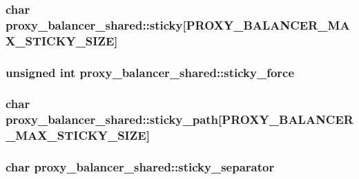 \subsubsection[{\texorpdfstring{sticky}{sticky}}]{\setlength{\rightskip}{0pt plus 5cm}char proxy\+\_\+balancer\+\_\+shared\+::sticky\mbox{[}{\bf P\+R\+O\+X\+Y\+\_\+\+B\+A\+L\+A\+N\+C\+E\+R\+\_\+\+M\+A\+X\+\_\+\+S\+T\+I\+C\+K\+Y\+\_\+\+S\+I\+ZE}\mbox{]}}\hypertarget{structproxy__balancer__shared_ab4c4a86341df3c258f51e8a828a21501}{}\label{structproxy__balancer__shared_ab4c4a86341df3c258f51e8a828a21501}
\subsubsection[{\texorpdfstring{sticky\+\_\+force}{sticky_force}}]{\setlength{\rightskip}{0pt plus 5cm}unsigned {\bf int} proxy\+\_\+balancer\+\_\+shared\+::sticky\+\_\+force}\hypertarget{structproxy__balancer__shared_ac47d5b71ae7e8c96e81f2d2d59c3f532}{}\label{structproxy__balancer__shared_ac47d5b71ae7e8c96e81f2d2d59c3f532}
\subsubsection[{\texorpdfstring{sticky\+\_\+path}{sticky_path}}]{\setlength{\rightskip}{0pt plus 5cm}char proxy\+\_\+balancer\+\_\+shared\+::sticky\+\_\+path\mbox{[}{\bf P\+R\+O\+X\+Y\+\_\+\+B\+A\+L\+A\+N\+C\+E\+R\+\_\+\+M\+A\+X\+\_\+\+S\+T\+I\+C\+K\+Y\+\_\+\+S\+I\+ZE}\mbox{]}}\hypertarget{structproxy__balancer__shared_a43e4e46db0e56aae901e99431d0cd3ce}{}\label{structproxy__balancer__shared_a43e4e46db0e56aae901e99431d0cd3ce}
\subsubsection[{\texorpdfstring{sticky\+\_\+separator}{sticky_separator}}]{\setlength{\rightskip}{0pt plus 5cm}char proxy\+\_\+balancer\+\_\+shared\+::sticky\+\_\+separator}\hypertarget{structproxy__balancer__shared_a37df47ec0f6c8567bfc755d72ed54e9c}{}\label{structproxy__balancer__shared_a37df47ec0f6c8567bfc755d72ed54e9c}
